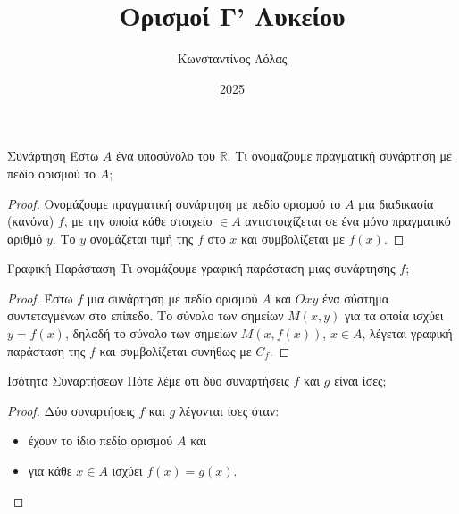 \documentclass[a4paper, 12pt]{article}
\title{Ορισμοί Γ' Λυκείου}
\author{Κωνσταντίνος Λόλας}
\date{2025}
\begin{document}
\maketitle

\begin{theorem}{Συνάρτηση}
  Έστω $Α$ ένα υποσύνολο του $\mathbb{R}$. Τι ονομάζουμε πραγματική συνάρτηση με πεδίο ορισμού το $Α$;
\end{theorem}
\begin{proof}
  Ονομάζουμε πραγματική συνάρτηση με πεδίο ορισμού το $Α$ μια διαδικασία (κανόνα) $f$, με την οποία κάθε στοιχείο $\in Α$ αντιστοιχίζεται σε ένα μόνο πραγματικό αριθμό $y$. Το $y$ ονομάζεται τιμή της $f$ στο $x$ και συμβολίζεται με $f(x)$.
\end{proof}

\begin{theorem}{Γραφική Παράσταση}
  Τι ονομάζουμε γραφική παράσταση μιας συνάρτησης $f$;
\end{theorem}
\begin{proof}
  Έστω $f$ μια συνάρτηση με πεδίο ορισμού $Α$ και $Oxy$ ένα σύστημα συντεταγμένων στο επίπεδο. Το σύνολο των σημείων $M(x, y)$ για τα οποία ισχύει $y = f(x)$, δηλαδή το σύνολο των σημείων $M(x, f(x))$, $x \in A$, λέγεται γραφική παράσταση της $f$ και συμβολίζεται συνήθως με $C_f$.
\end{proof}

\begin{theorem}{Ισότητα Συναρτήσεων}
  Πότε λέμε ότι δύο συναρτήσεις $f$ και $g$ είναι ίσες;
\end{theorem}
\begin{proof}
  Δύο συναρτήσεις $f$ και $g$ λέγονται ίσες όταν:
  \begin{itemize}
    \item έχουν το ίδιο πεδίο ορισμού $Α$ και
    \item για κάθε $x \in A$ ισχύει $f(x) = g(x)$.
  \end{itemize}
\end{proof}
\end{document}
